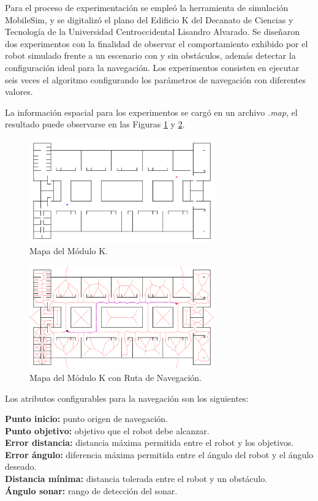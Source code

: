 \documentclass[11pt,twoside,A5]{article}
\begin{document}
Para el proceso de experimentación se empleó la herramienta de simulación MobileSim, y se digitalizó el plano del 
Edificio K del Decanato de Ciencias y Tecnología de la Universidad Centroccidental Lisandro Alvarado. Se diseñaron
dos experimentos con la finalidad de observar el comportamiento exhibido por el robot simulado frente a un escenario
con y sin obstáculos, además detectar la configuración ideal para la navegación.
Los experimentos consisten en ejecutar seis veces el algoritmo configurando los parámetros 
de navegación con diferentes valores.

La información espacial para los experimentos se cargó en un archivo \textit{.map}, el resultado puede observarse 
en las Figuras \ref{fig:mapa-k} y \ref{fig:mapa-k-ruta}.

\begin{figure}[H]
\begin{center}
\includegraphics[width=8cm]{mapa-k.png} 
\caption{Mapa del Módulo K.}
\label{fig:mapa-k}
\end{center}
\end{figure} 

\begin{figure}[H]
\begin{center}
\includegraphics[width=8cm]{mapa-k-ruta.png} 
\caption{Mapa del Módulo K con Ruta de Navegación.}
\label{fig:mapa-k-ruta}
\end{center}
\end{figure} 

Los atributos configurables para la navegación son los siguientes:

\noindent\textbf{Punto inicio:} punto origen de navegación.\\
\textbf{Punto objetivo:} objetivo que el robot debe alcanzar.\\
\textbf{Error distancia:} distancia máxima permitida entre el robot y los objetivos.\\
\textbf{Error ángulo:} diferencia máxima permitida entre el ángulo del robot y el ángulo deseado.\\
\textbf{Distancia mínima:} distancia tolerada entre el robot y un obstáculo.\\
\textbf{Ángulo sonar:} rango de detección del sonar.
\end{document}
